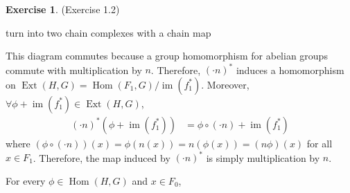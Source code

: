 \documentclass[12pt, psamsfonts]{amsart}
\theoremstyle{definition}
\newtheorem*{exer}{Exercise}
\theoremstyle{remark}
\DeclareMathOperator{\Hom}{Hom}
\DeclareMathOperator{\Ext}{Ext}
\DeclareMathOperator{\Hom}{Hom}
\DeclareMathOperator{\im}{im}
\numberwithin{equation}{section}
\begin{document}
\begin{exer}{(Exercise 1.2)}
  \begin{center}
  \end{center}
  turn into two chain complexes with a chain map
  \begin{center}
  \end{center}
  This diagram commutes because a group homomorphism for abelian groups commute with multiplication by $n$.
  Therefore, $(\cdot n)^{\ast}$ induces a homomorphism on $\Ext(H, G) = \Hom(F_1, G) / \im(f_1^{\ast})$.
  Moreover, $\forall \phi + \im(f_1^{\ast}) \in \Ext(H, G)$,
  \begin{align*}
    (\cdot n)^{\ast}(\phi + \im(f_1^{\ast}))
      &= \phi \circ (\cdot n) + \im(f_1^{\ast})
  \end{align*}
  where $(\phi \circ (\cdot n))(x) = \phi(n(x)) = n(\phi(x)) = (n\phi)(x)$ for all $x \in F_1$.
  Therefore, the map induced by $(\cdot n)^{\ast}$ is simply multiplication by $n$.

  \begin{center}
  \end{center}
  For every $\phi \in \Hom(H, G)$ and $x \in F_0$,


\end{exer}
\end{document}
